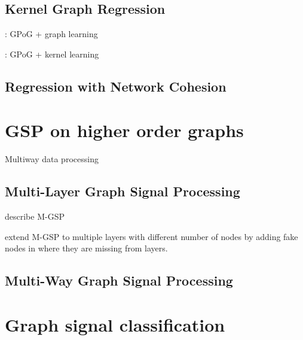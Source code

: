 \subsection{Kernel Graph Regression}

\cite{Venkitaraman2020}

\cite{Miao2022}: GPoG + graph learning

\cite{Zhi2023}: GPoG + kernel learning

\cite{Elias2022}

\subsection{Regression with Network Cohesion}

\cite{Le2022}

\cite{Li2019}

\section{GSP on higher order graphs}

Multiway data processing 

\cite{Smilde2004}
\cite{Kroonenberg2008}


\cite{Ji2019}

\cite{Cammoun2009}


\subsection{Multi-Layer Graph Signal Processing}

\cite{Zhang2022} describe M-GSP 

\cite{Zhang2018} extend M-GSP to multiple layers with different number of nodes by adding fake nodes in where they are missing from layers. 
 

\subsection{Multi-Way Graph Signal Processing}


\cite{Zhao2023}

\cite{Li2012}



\section{Graph signal classification}

\cite{Tran2020}

\cite{Sandryhaila2013a}

